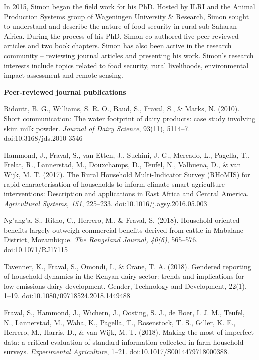 In 2015, Simon began the field work for his PhD. Hosted by ILRI and the Animal Production Systems group of Wageningen University \& Research, Simon sought to understand and describe the nature of food security in rural sub-Saharan Africa. During the process of his PhD, Simon co-authored five peer-reviewed articles and two book chapters. Simon has also been active in the research community -- reviewing journal articles and presenting his work.
Simon's research interests include topics related to food security, rural livelihoods, environmental impact assessment and remote sensing. 



\newpage

\small
{\normalsize\textbf{Peer-reviewed journal publications}}


Ridoutt, B. G., Williams, S. R. O., Baud, S., Fraval, S., \& Marks, N. (2010). Short communication: The water footprint of dairy products: case study involving skim milk powder. \textit{Journal of Dairy Science}, 93(11), 5114–7. doi:10.3168/jds.2010-3546

Hammond, J., Fraval, S., van Etten, J., Suchini, J. G., Mercado, L., Pagella, T., Frelat, R., Lannerstad, M., Douxchamps, D., Teufel, N., Valbuena, D., \& van Wijk, M. T. (2017). The Rural Household Multi-Indicator Survey (RHoMIS) for rapid characterisation of households to inform climate smart agriculture interventions: Description and applications in East Africa and Central America. \textit{Agricultural Systems, 151}, 225–233. doi:10.1016/j.agsy.2016.05.003

Ng'ang'a, S., Ritho, C., Herrero, M., \& Fraval, S. (2018). Household-oriented benefits largely outweigh commercial benefits derived from cattle in Mabalane District, Mozambique. \textit{The Rangeland Journal, 40(6)}, 565–576. doi:10.1071/RJ17115

Tavenner, K., Fraval, S., Omondi, I., \& Crane, T. A. (2018). Gendered reporting of household dynamics in the Kenyan dairy sector: trends and implications for low emissions dairy development. Gender, Technology and Development, 22(1), 1–19. doi:10.1080/09718524.2018.1449488

Fraval, S., Hammond, J., Wichern, J., Oosting, S. J., de Boer, I. J. M., Teufel, N., Lannerstad, M., Waha, K., Pagella, T., Rosenstock, T. S., Giller, K. E., Herrero, M., Harris, D., \& van Wijk, M. T. (2018). Making the most of imperfect data: a critical evaluation of standard information collected in farm household surveys. \textit{Experimental Agriculture}, 1–21. doi:10.1017/S0014479718000388.

